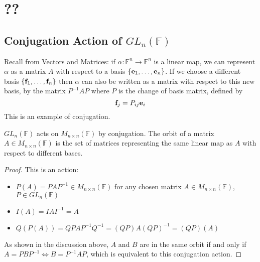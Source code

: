 \documentclass{article}
\begin{document}
\section{??}
\subsection{Conjugation Action of $GL_n(\mathbb F)$}
Recall from Vectors and Matrices: if $\alpha\colon \mathbb F^n \to \mathbb F^n$ is a linear map, we can represent $\alpha$ as a matrix $A$ with respect to a basis $\{ \vb e_1, \dots, \vb e_n \}$. If we choose a different basis $\{ \vb f_1, \dots, \vb f_n \}$ then $\alpha$ can also be written as a matrix with respect to this new basis, by the matrix $P^{-1}AP$ where $P$ is the change of basis matrix, defined by
\[ \vb f_j = P_{ij}\vb e_i \]
This is an example of conjugation.
\begin{proposition}
	$GL_n(\mathbb F)$ acts on $M_{n \times n}(\mathbb F)$ by conjugation. The orbit of a matrix $A \in M_{n \times n}(\mathbb F)$ is the set of matrices representing the same linear map as $A$ with respect to different bases.
\end{proposition}
\begin{proof}
	This is an action:
	\begin{itemize}
		\item $P(A) = PAP^{-1} \in M_{n \times n}(\mathbb F)$ for any chosen matrix $A \in M_{n \times n}(\mathbb F)$, $P \in GL_n(\mathbb F)$
		\item $I(A) = IAI^{-1} = A$
		\item $Q(P(A)) = QPAP^{-1}Q^{-1} = (QP)A(QP)^{-1} = (QP)(A)$
	\end{itemize}
	As shown in the discussion above, $A$ and $B$ are in the same orbit if and only if $A = PBP^{-1} \iff B = P^{-1}AP$, which is equivalent to this conjugation action.
\end{proof}
\end{document}
